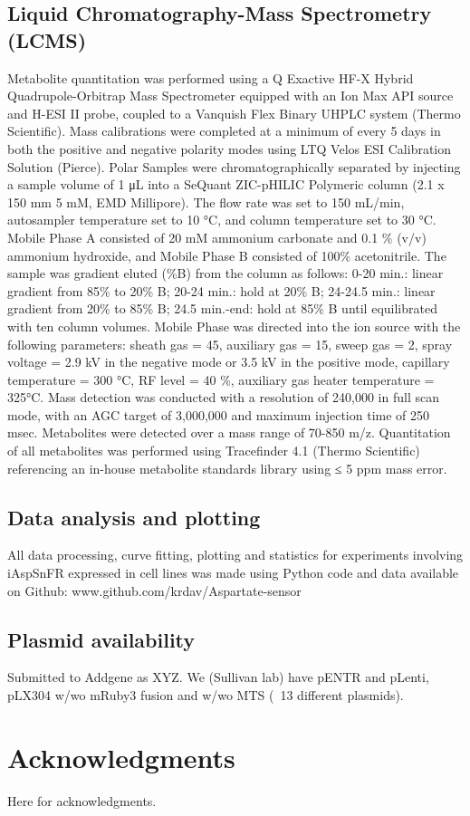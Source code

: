 \documentclass[9pt,lineno]{elife}
\begin{document}
\subsection{Liquid Chromatography-Mass Spectrometry (LCMS)}
Metabolite quantitation was performed using a Q Exactive HF-X Hybrid Quadrupole-Orbitrap Mass Spectrometer equipped with an Ion Max API source and H-ESI II probe, coupled to a Vanquish Flex Binary UHPLC system (Thermo Scientific).
Mass calibrations were completed at a minimum of every 5 days in both the positive and negative polarity modes using LTQ Velos ESI Calibration Solution (Pierce).
Polar Samples were chromatographically separated by injecting a sample volume of 1 μL into a SeQuant ZIC-pHILIC Polymeric column (2.1 x 150 mm 5 mM, EMD Millipore).
The flow rate was set to 150 mL/min, autosampler temperature set to 10 °C, and column temperature set to 30 °C.
Mobile Phase A consisted of 20 mM ammonium carbonate and 0.1 \% (v/v) ammonium hydroxide, and Mobile Phase B consisted of 100\% acetonitrile.
The sample was gradient eluted (\%B) from the column as follows: 0-20 min.: linear gradient from 85\% to 20\% B; 20-24 min.: hold at 20\% B; 24-24.5 min.: linear gradient from 20\% to 85\% B; 24.5 min.-end: hold at 85\% B until equilibrated with ten column volumes.
Mobile Phase was directed into the ion source with the following parameters: sheath gas = 45, auxiliary gas = 15, sweep gas = 2, spray voltage = 2.9 kV in the negative mode or 3.5 kV in the positive mode, capillary temperature = 300 °C, RF level = 40 \%, auxiliary gas heater temperature = 325°C.
Mass detection was conducted with a resolution of 240,000 in full scan mode, with an AGC target of 3,000,000 and maximum injection time of 250 msec.
Metabolites were detected over a mass range of 70-850 m/z.
Quantitation of all metabolites was performed using Tracefinder 4.1 (Thermo Scientific) referencing an in-house metabolite standards library using ≤ 5 ppm mass error.

\subsection{Data analysis and plotting}
All data processing, curve fitting, plotting and statistics for experiments involving iAspSnFR expressed in cell lines was made using Python code and data available on Github:
www.github.com/krdav/Aspartate-sensor

\subsection{Plasmid availability}
Submitted to Addgene as XYZ.
We (Sullivan lab) have pENTR and pLenti, pLX304 w/wo mRuby3 fusion and w/wo MTS (~13 different plasmids).




\section{Acknowledgments}
Here for acknowledgments.




\end{document}
